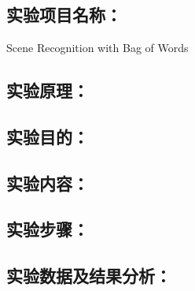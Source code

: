 \documentclass[a4paper,11pt,UTF8,AutoFakeBold]{ctexart}
\begin{document}
\xiaosihao {}  

\author{谢卿云}


\chapter{}{}{}           %

\section{实验项目名称：}
Scene Recognition with Bag of Words

\section{实验原理：}




\section{实验目的：}


\section{实验内容：}


% 

\section{实验步骤：}


\section{实验数据及结果分析：}

\end{document}
